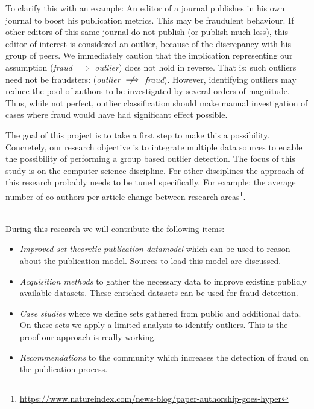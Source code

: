 \documentclass{ou-report}
\begin{document}
To clarify this with an example: An editor of a journal publishes in his 
own journal to boost his publication metrics. This may be fraudulent behaviour. 
If other editors of this same journal do not publish (or publish much less), 
this editor of interest is considered an outlier, because of the discrepancy 
with his group of peers. 
We immediately caution that the implication representing our assumption
(\emph{fraud} $\implies$ \emph{outlier})
does not hold in reverse. That is: such outliers need not be fraudsters: 
(\emph{outlier} $\centernot\implies$ \emph{fraud}). 
However, identifying outliers may reduce the pool of authors to be investigated
by several orders of magnitude. Thus, while not perfect, outlier classification
should make manual investigation of cases where fraud would have had significant
effect possible.

The goal of this project is to take a first step to make this a possibility.
Concretely, our research objective is to integrate multiple data sources to
enable the possibility of performing a group based outlier detection.
The focus of this study is on the computer science 
discipline. For other disciplines the approach of this research probably needs
to be tuned specifically. 
For example: the average number of co-authors per article change between
research areas\footnote{\url{https://www.natureindex.com/news-blog/paper-authorship-goes-hyper}}.

\ \\
During this research we will contribute the following items:
\begin{itemize}
    \item \emph{Improved set-theoretic publication datamodel} which can be used
        to reason about the publication model. Sources to load this model are 
        discussed.
    \item \emph{Acquisition methods} to gather the necessary data to improve
        existing publicly available datasets. These enriched datasets can be
        used for fraud detection.
    \item \emph{Case studies} where we define sets gathered from public and
        additional data. On these sets we apply a limited analysis to identify
        outliers. This is the proof our approach is really working.
    \item \emph{Recommendations} to the community which increases the detection
        of fraud on the publication process. 
\end{itemize}
\end{document}
